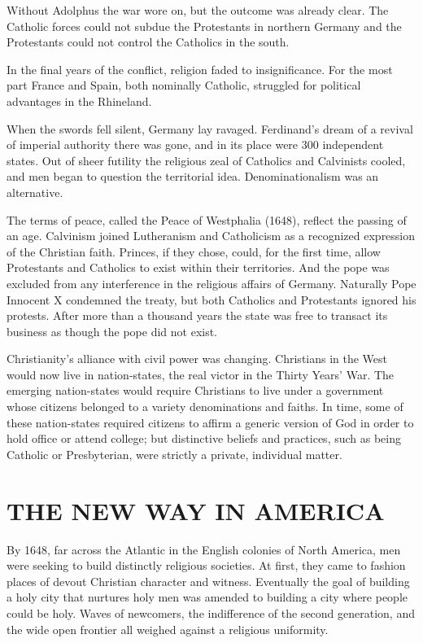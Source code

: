 Without Adolphus the war wore on, but the outcome was already clear. The Catholic forces could not
subdue the Protestants in northern Germany and the Protestants could not control the Catholics in
the south.

In the final years of the conflict, religion faded to insignificance. For the most part France and
Spain, both nominally Catholic, struggled for political advantages in the Rhineland.

When the swords fell silent, Germany lay ravaged. Ferdinand’s dream of a revival of imperial
authority there was gone, and in its place were 300 independent states. Out of sheer futility the
religious zeal of Catholics and Calvinists cooled, and men began to question the territorial idea.
Denominationalism was an alternative.

The terms of peace, called the Peace of Westphalia (1648), reflect the passing of an age. Calvinism
joined Lutheranism and Catholicism as a recognized expression of the Christian faith. Princes, if
they chose, could, for the first time, allow Protestants and Catholics to exist within their
territories. And the pope was excluded from any interference in the religious affairs of Germany.
Naturally Pope Innocent X condemned the treaty, but both Catholics and Protestants ignored his
protests. After more than a thousand years the state was free to transact its business as though the
pope did not exist.

Christianity’s alliance with civil power was changing. Christians in the West would now live in
nation-states, the real victor in the Thirty Years’ War. The emerging nation-states would require
Christians to live under a government whose citizens belonged to a variety denominations and faiths.
In time, some of these nation-states required citizens to affirm a generic version of God in order
to hold office or attend college; but distinctive beliefs and practices, such as being Catholic or
Presbyterian, were strictly a private, individual matter.

\section{THE NEW WAY IN AMERICA}

By 1648, far across the Atlantic in the English colonies of North America, men were seeking to build
distinctly religious societies. At first, they came to fashion places of devout Christian character
and witness. Eventually the goal of building a holy city that nurtures holy men was amended to
building a city where people could be holy. Waves of newcomers, the indifference of the second
generation, and the wide open frontier all weighed against a religious uniformity.

